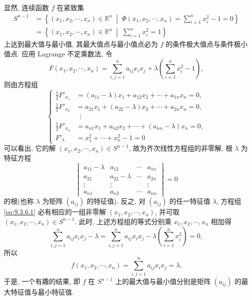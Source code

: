 \begin{solution}
显然, 连续函数 $f$ 在紧致集
\begin{align*}
  S^{n-1} &= \left\{(x_{1}, x_{2}, \cdots, x_{n}) \in \mathbb{R}^{n} \;\middle|\; \Phi(x_{1}, x_{2}, \cdots, x_{n}) = \sum_{i=1}^{n} x_{i}^{2} - 1 = 0\right\} \\
  &= \left\{(x_{1}, x_{2}, \cdots, x_{n}) \in \mathbb{R}^{n} \;\middle|\; \sum_{i=1}^{n} x_{i}^{2} = 1\right\}
\end{align*}
上达到最大值与最小值, 其最大值点与最小值点必为 $f$ 的条件极大值点与条件极小值点. 应用 Lagrange 不定乘数法, 令
\[
  F(x_{1}, x_{2}, \cdots, x_{n}) = \sum_{i,j=1}^{n} a_{ij}x_{i}x_{j} + \lambda\left(\sum_{i=1}^{n} x_{i}^{2} - 1\right),
\]
则由方程组
\begin{equation}\label{eq:9.3.6.1}
  \left\{\begin{aligned}
    \frac{1}{2}F'_{x_{1}} &= (a_{11} - \lambda)x_{1} + a_{12}x_{2} + \cdots + a_{1n}x_{n} = 0, \\
    \frac{1}{2}F'_{x_{2}} &= a_{21}x_{1} + (a_{22} - \lambda)x_{2} + \cdots + a_{2n}x_{n} = 0, \\
    &\;\;\vdots \\
    \frac{1}{2}F'_{x_{n}} &= a_{n1}x_{1} + a_{n2}x_{2} + \cdots + (a_{nn} - \lambda)x_{n} = 0, \\
    F'_{\lambda} &= x_{1}^{2} + \cdots + x_{n}^{2} - 1 = 0
  \end{aligned}\right.
\end{equation}
可以看出, 它的解 $(x_{1}, x_{2}, \cdots, x_{n}) \in S^{n-1}$, 故为齐次线性方程组的非零解, 根 $\lambda$ 为特征方程
\[
  \begin{vmatrix}
    a_{11} - \lambda & a_{12} & \cdots & a_{1n} \\
    a_{21} & a_{22} - \lambda & \cdots & a_{2n} \\
    \vdots & \vdots & & \vdots \\
    a_{n1} & a_{n2} & \cdots & a_{nn}
  \end{vmatrix} = 0
\]
的根(也称 $\lambda$ 为矩阵 $(a_{ij})$ 的特征值). 反之, 对 $(a_{ij})$ 的任一特征值 $\lambda$, 方程组 \eqref{eq:9.3.6.1} 必有相应的一组非零解 $(x_{1}, x_{2}, \cdots, x_{n})$, 并可取 $(x_{1}, x_{2}, \cdots, x_{n}) \in S^{n-1}$. 此时, 上述方程组的等式分别乘 $x_{1}, x_{2}, \cdots, x_{n}$ 相加得
\[
  \sum_{i,j=1}^{n} a_{ij}x_{i}x_{j} - \lambda = \sum_{i,j=1}^{n} a_{ij}x_{i}x_{j} - \lambda\left(\sum_{i=1}^{n} x_{i}^{2}\right) = 0,
\]
所以
\[
  f(x_{1}, x_{2}, \cdots, x_{n}) = \sum_{i,j=1}^{n} a_{ij}x_{i}x_{j} = \lambda.
\]
于是, 一个有趣的结果, 即 $f$ 在 $S^{n-1}$ 上的最大值与最小值分别是矩阵 $(a_{ij})$ 的最大特征值与最小特征值.
\end{solution}

